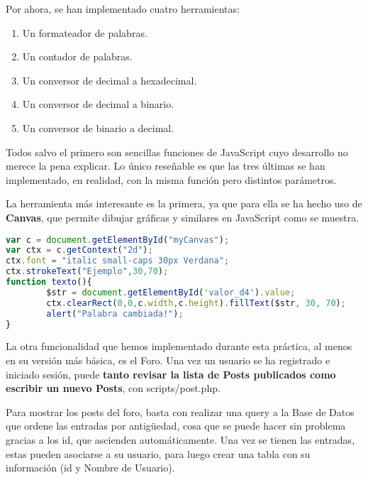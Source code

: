 \documentclass[12pt]{report}
\begin{document}
Por ahora, se han implementado cuatro herramientas:
\begin{enumerate}
    \item Un formateador de palabras.
    \item Un contador de palabras.
    \item Un conversor de decimal a hexadecimal.
    \item Un conversor de decimal a binario.
    \item Un conversor de binario a decimal.
\end{enumerate}
Todos salvo el primero son sencillas funciones de JavaScript cuyo desarrollo no merece la pena explicar. Lo único reseñable es que las tres últimas se han implementado, en realidad, con la misma función pero distintos parámetros.

La herramienta más interesante es la primera, ya que para ella se ha hecho uso de \textbf{Canvas}, que permite dibujar gráficas y similares en JavaScript como se muestra.

\begin{figure}[h]
    \qquad
    \label{fig:example}%
\end{figure}

\begin{lstlisting}[language=JavaScript]
var c = document.getElementById("myCanvas");
var ctx = c.getContext("2d");
ctx.font = "italic small-caps 30px Verdana";
ctx.strokeText("Ejemplo",30,70);
function texto(){
        $str = document.getElementById('valor_d4').value;
        ctx.clearRect(0,0,c.width,c.height).fillText($str, 30, 70);
        alert("Palabra cambiada!");
}
\end{lstlisting}

La otra funcionalidad que hemos implementado durante esta práctica, al menos en su versión más básica, es el Foro. Una vez un usuario se ha registrado e iniciado sesión, puede \textbf{tanto revisar la lista de Posts publicados como escribir un nuevo Posts}, con scripts/post.php.

Para mostrar los posts del foro, basta con realizar una query a la Base de Datos que ordene las entradas por antigüedad, cosa que se puede hacer sin problema gracias a los id, que ascienden automáticamente. Una vez se tienen las entradas, estas pueden asociarse a su usuario, para luego crear una tabla con su información (id y Nombre de Usuario).
\newline
\end{document}
